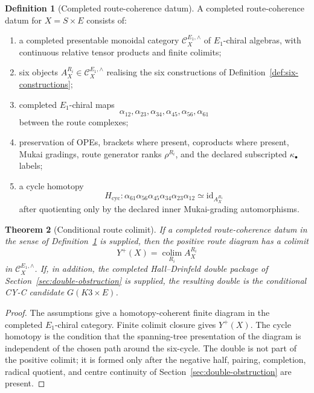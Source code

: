 \documentclass[11pt]{amsart}
\theoremstyle{plain}
\newtheorem{theorem}{Theorem}[section]
\theoremstyle{definition}
\newtheorem{definition}[theorem]{Definition}
\theoremstyle{remark}
\providecommand{\Eone}{E_1}
\providecommand{\rhoR}{\rho}
\providecommand{\id}{\mathrm{id}}
\begin{document}
\begin{definition}[Completed route-coherence datum]
\label{def:route-coherence-datum}
A completed route-coherence datum for $X=S\times E$ consists of:
\begin{enumerate}[label=\textup{(C\arabic*)},leftmargin=2.5em]
\item a completed presentable monoidal category
$\mathcal C_X^{E_1,\wedge}$ of $\Eone$-chiral algebras, with continuous
relative tensor products and finite colimits;
\item six objects $A_X^{R_i}\in\mathcal C_X^{E_1,\wedge}$ realising the
six constructions of Definition~\ref{def:six-constructions};
\item completed $\Eone$-chiral maps
\[
 \alpha_{12},\alpha_{23},\alpha_{34},\alpha_{45},\alpha_{56},\alpha_{61}
\]
between the route complexes;
\item preservation of OPEs, brackets where present, coproducts where
present, Mukai gradings, route generator ranks $\rhoR^{R_i}$, and the
declared subscripted $\kappa_\bullet$ labels;
\item a cycle homotopy
\[
 H_{\mathrm{cyc}}\colon
 \alpha_{61}\alpha_{56}\alpha_{45}\alpha_{34}\alpha_{23}\alpha_{12}
 \simeq \id_{A_X^{R_1}}
\]
after quotienting only by the declared inner Mukai-grading
automorphisms.
\end{enumerate}
\end{definition}

\begin{theorem}[Conditional route colimit]
\label{thm:conditional-route-colimit}
If a completed route-coherence datum in the sense of
Definition~\ref{def:route-coherence-datum} is supplied, then the
positive route diagram has a colimit
\[
 Y^+(X)=\operatorname*{colim}_{R_i} A_X^{R_i}
\]
in $\mathcal C_X^{E_1,\wedge}$.  If, in addition, the completed
Hall--Drinfeld double package of Section~\ref{sec:double-obstruction} is
supplied, the resulting double is the conditional CY-C candidate
$G(K3\times E)$.
\end{theorem}

\begin{proof}
The assumptions give a homotopy-coherent finite diagram in the completed
$\Eone$-chiral category.  Finite colimit closure gives $Y^+(X)$.  The
cycle homotopy is the condition that the spanning-tree presentation of
the diagram is independent of the chosen path around the six-cycle.  The
double is not part of the positive colimit; it is formed only after the
negative half, pairing, completion, radical quotient, and centre
continuity of Section~\ref{sec:double-obstruction} are present.
\end{proof}
\end{document}
